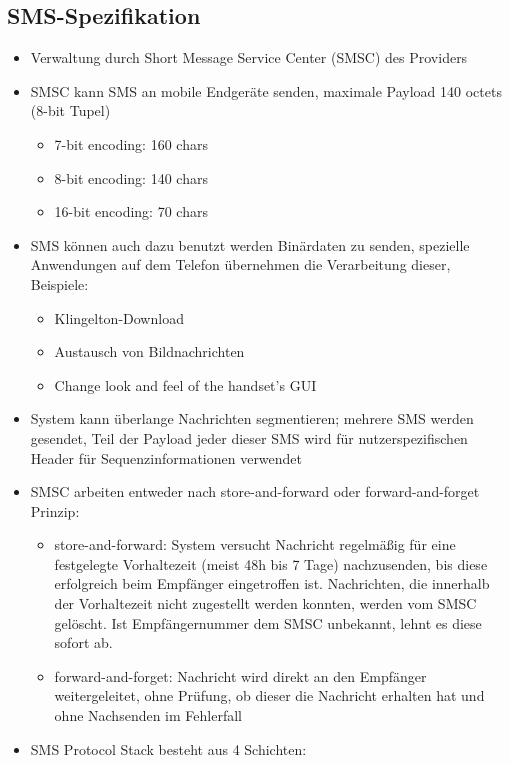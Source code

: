 \documentclass[german,12pt,a4paper]{article}
\begin{document}
\subsection{SMS-Spezifikation}
\begin{itemize}
	\item Verwaltung durch Short Message Service Center (SMSC) des Providers
	\item SMSC kann SMS an mobile Endgeräte senden, maximale Payload 140 octets (8-bit Tupel)
		\begin{itemize}
			\item 7-bit encoding: 160 chars
			\item 8-bit encoding: 140 chars
			\item 16-bit encoding: 70 chars
		\end{itemize}
	\item SMS können auch dazu benutzt werden Binärdaten zu senden, spezielle Anwendungen auf 
		dem Telefon übernehmen die Verarbeitung dieser, Beispiele:
		\begin{itemize}
			\item Klingelton-Download
			\item Austausch von Bildnachrichten
			\item Change look and feel of the handset's GUI
		\end{itemize}		
	\item System kann überlange Nachrichten segmentieren; mehrere SMS werden gesendet, Teil der Payload jeder
		dieser SMS wird für nutzerspezifischen Header für Sequenzinformationen verwendet
	\item SMSC arbeiten entweder nach store-and-forward oder forward-and-forget Prinzip:
		\begin{itemize}
			\item store-and-forward: System versucht Nachricht regelmäßig für eine festgelegte 
				Vorhaltezeit (meist 48h bis 7 Tage) nachzusenden, bis diese erfolgreich beim Empfänger 
				eingetroffen ist. Nachrichten, die innerhalb der Vorhaltezeit nicht zugestellt werden 
				konnten, werden vom SMSC gelöscht. Ist Empfängernummer dem SMSC unbekannt, lehnt es diese sofort ab.
			\item forward-and-forget: Nachricht wird direkt an den Empfänger weitergeleitet, ohne Prüfung, ob 
				dieser die Nachricht erhalten hat und ohne Nachsenden im Fehlerfall
		\end{itemize}	
	\item SMS Protocol Stack besteht aus 4 Schichten:
		\begin{itemize}

\end{itemize}
\end{itemize}
\end{document}
